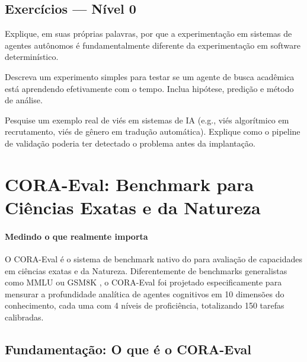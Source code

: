 \subsection{Exercícios — Nível 0}

\begin{exercicio}
Explique, em suas próprias palavras, por que a experimentação em
sistemas de agentes autônomos é fundamentalmente diferente da
experimentação em software determinístico.
\end{exercicio}

\begin{exercicio}
Descreva um experimento simples para testar se um agente de busca
acadêmica está aprendendo efetivamente com o tempo. Inclua hipótese,
predição e método de análise.
\end{exercicio}

\begin{exercicio}
Pesquise um exemplo real de viés em sistemas de IA (e.g., viés
algorítmico em recrutamento, viés de gênero em tradução automática).
Explique como o pipeline de validação poderia ter detectado o
problema antes da implantação.
\end{exercicio}

\section{CORA-Eval: Benchmark para Ciências Exatas e da Natureza}
\label{sec:cora-eval}
\nivelphd

\paragraph{Medindo o que realmente importa} O CORA-Eval é o sistema de benchmark nativo do \opencodeeco{} para
avaliação de capacidades em ciências exatas e da Natureza.
Diferentemente de benchmarks generalistas como MMLU \cite{hendrycks2021measuring}
ou GSM8K \cite{cobbe2021training}, o CORA-Eval foi projetado
especificamente para mensurar a profundidade analítica de agentes
cognitivos em 10 dimensões do conhecimento, cada uma com 4 níveis
de proficiência, totalizando 150 tarefas calibradas.

\subsection{Fundamentação: O que é o CORA-Eval}


